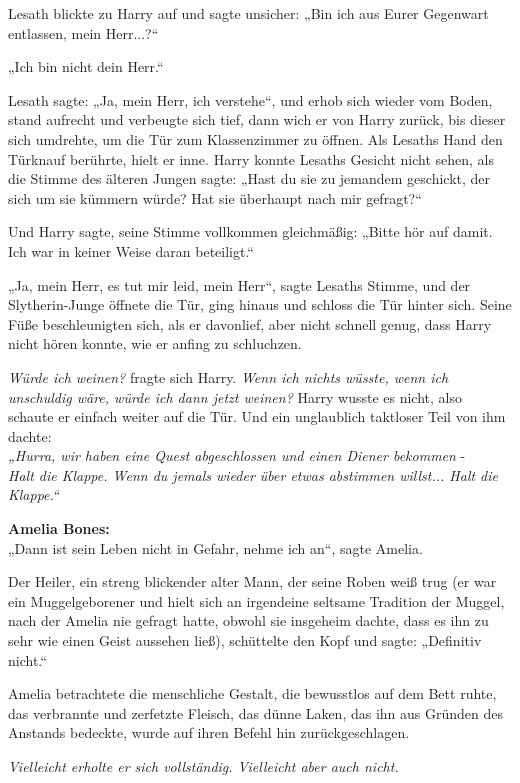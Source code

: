 {Lesath blickte zu Harry auf und sagte unsicher: „Bin ich aus Eurer Gegenwart entlassen, mein Herr...?“

„Ich bin nicht dein Herr.“

Lesath sagte: „Ja, mein Herr, ich verstehe“, und erhob sich wieder vom Boden, stand aufrecht und verbeugte sich tief, dann wich er von Harry zurück, bis dieser sich umdrehte, um die Tür zum Klassenzimmer zu öffnen. Als Lesaths Hand den Türknauf berührte, hielt er inne. Harry konnte Lesaths Gesicht nicht sehen, als die Stimme des älteren Jungen sagte: „Hast du sie zu jemandem geschickt, der sich um sie kümmern würde? Hat sie überhaupt nach mir gefragt?“

Und Harry sagte, seine Stimme vollkommen gleichmäßig: „Bitte hör auf damit. Ich war in keiner Weise daran beteiligt.“

„Ja, mein Herr, es tut mir leid, mein Herr“, sagte Lesaths Stimme, und der Slytherin-Junge öffnete die Tür, ging hinaus und schloss die Tür hinter sich. Seine Füße beschleunigten sich, als er davonlief, aber nicht schnell genug, dass Harry nicht hören konnte, wie er anfing zu schluchzen.

\emph{Würde ich weinen?} fragte sich Harry. \emph{Wenn ich nichts wüsste, wenn ich unschuldig wäre, würde ich dann jetzt weinen?} Harry wusste es nicht, also schaute er einfach weiter auf die Tür. Und ein unglaublich taktloser Teil von ihm dachte:\\ \emph{„Hurra, wir haben eine Quest abgeschlossen und einen Diener bekommen} -\\ \emph{Halt die Klappe. Wenn du jemals wieder über etwas abstimmen willst... Halt die Klappe.“}

\hfill\break \textbf{Amelia Bones:}\\ „Dann ist sein Leben nicht in Gefahr, nehme ich an“, sagte Amelia.

Der Heiler, ein streng blickender alter Mann, der seine Roben weiß trug (er war ein Muggelgeborener und hielt sich an irgendeine seltsame Tradition der Muggel, nach der Amelia nie gefragt hatte, obwohl sie insgeheim dachte, dass es ihn zu sehr wie einen Geist aussehen ließ), schüttelte den Kopf und sagte: „Definitiv nicht.“

Amelia betrachtete die menschliche Gestalt, die bewusstlos auf dem Bett ruhte, das verbrannte und zerfetzte Fleisch, das dünne Laken, das ihn aus Gründen des Anstands bedeckte, wurde auf ihren Befehl hin zurückgeschlagen.

\emph{Vielleicht erholte er sich vollständig. Vielleicht aber auch nicht.}

}
